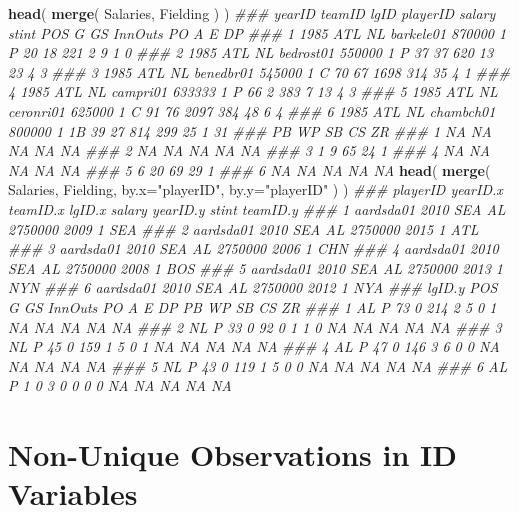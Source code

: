 \documentclass[]{book}
\newenvironment{Shaded}{\begin{snugshade}}{\end{snugshade}}
\newcommand{\CommentTok}[1]{\textcolor[rgb]{0.56,0.35,0.01}{\textit{#1}}}
\newcommand{\DataTypeTok}[1]{\textcolor[rgb]{0.13,0.29,0.53}{#1}}
\newcommand{\KeywordTok}[1]{\textcolor[rgb]{0.13,0.29,0.53}{\textbf{#1}}}
\newcommand{\NormalTok}[1]{#1}
\newcommand{\StringTok}[1]{\textcolor[rgb]{0.31,0.60,0.02}{#1}}
\theoremstyle{definition}
\theoremstyle{definition}
\theoremstyle{definition}
\theoremstyle{remark}
\begin{document}
\begin{Shaded}
\begin{Highlighting}[]
\KeywordTok{head}\NormalTok{( }\KeywordTok{merge}\NormalTok{( Salaries, Fielding ) )}
\CommentTok{###   yearID teamID lgID  playerID salary stint POS  G GS InnOuts  PO  A E DP}
\CommentTok{### 1   1985    ATL   NL barkele01 870000     1   P 20 18     221   2  9 1  0}
\CommentTok{### 2   1985    ATL   NL bedrost01 550000     1   P 37 37     620  13 23 4  3}
\CommentTok{### 3   1985    ATL   NL benedbr01 545000     1   C 70 67    1698 314 35 4  1}
\CommentTok{### 4   1985    ATL   NL  campri01 633333     1   P 66  2     383   7 13 4  3}
\CommentTok{### 5   1985    ATL   NL ceronri01 625000     1   C 91 76    2097 384 48 6  4}
\CommentTok{### 6   1985    ATL   NL chambch01 800000     1  1B 39 27     814 299 25 1 31}
\CommentTok{###   PB WP SB CS ZR}
\CommentTok{### 1 NA NA NA NA NA}
\CommentTok{### 2 NA NA NA NA NA}
\CommentTok{### 3  1  9 65 24  1}
\CommentTok{### 4 NA NA NA NA NA}
\CommentTok{### 5  6 20 69 29  1}
\CommentTok{### 6 NA NA NA NA NA}
\KeywordTok{head}\NormalTok{( }\KeywordTok{merge}\NormalTok{( Salaries, Fielding, }\DataTypeTok{by.x=}\StringTok{"playerID"}\NormalTok{, }\DataTypeTok{by.y=}\StringTok{"playerID"}\NormalTok{ ) )}
\CommentTok{###    playerID yearID.x teamID.x lgID.x  salary yearID.y stint teamID.y}
\CommentTok{### 1 aardsda01     2010      SEA     AL 2750000     2009     1      SEA}
\CommentTok{### 2 aardsda01     2010      SEA     AL 2750000     2015     1      ATL}
\CommentTok{### 3 aardsda01     2010      SEA     AL 2750000     2006     1      CHN}
\CommentTok{### 4 aardsda01     2010      SEA     AL 2750000     2008     1      BOS}
\CommentTok{### 5 aardsda01     2010      SEA     AL 2750000     2013     1      NYN}
\CommentTok{### 6 aardsda01     2010      SEA     AL 2750000     2012     1      NYA}
\CommentTok{###   lgID.y POS  G GS InnOuts PO A E DP PB WP SB CS ZR}
\CommentTok{### 1     AL   P 73  0     214  2 5 0  1 NA NA NA NA NA}
\CommentTok{### 2     NL   P 33  0      92  0 1 1  0 NA NA NA NA NA}
\CommentTok{### 3     NL   P 45  0     159  1 5 0  1 NA NA NA NA NA}
\CommentTok{### 4     AL   P 47  0     146  3 6 0  0 NA NA NA NA NA}
\CommentTok{### 5     NL   P 43  0     119  1 5 0  0 NA NA NA NA NA}
\CommentTok{### 6     AL   P  1  0       3  0 0 0  0 NA NA NA NA NA}
\end{Highlighting}
\end{Shaded}

\hypertarget{non-unique-observations-in-id-variables}{%
\section{Non-Unique Observations in ID
Variables}\label{non-unique-observations-in-id-variables}}
\end{document}
